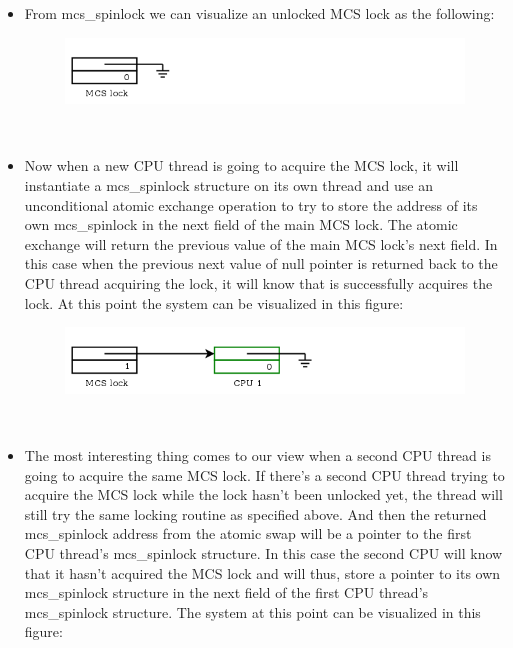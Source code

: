 \documentclass[10pt]{sigplanconf}
\begin{document}
\begin{itemize}
	\item From mcs\_spinlock we can visualize an unlocked MCS lock as the following:\\
	\begin{figure}[h]
		\includegraphics[scale=0.4]{mcslock1.png}
	\end{figure}\\
	\item Now when a new CPU thread is going to acquire the MCS lock, it will instantiate a mcs\_spinlock structure on its own thread and use an unconditional atomic exchange operation to try to store the address of its own mcs\_spinlock in the next field of the main MCS lock. The atomic exchange will return the previous value of the main MCS lock's next field. In this case when the previous next value of null pointer is returned back to the CPU thread acquiring the lock, it will know that is successfully acquires the lock. At this point the system can be visualized in this figure:\\
	\begin{figure}[h!]
		\includegraphics[scale=0.4]{mcslock2.png}
	\end{figure}\\
	\item The most interesting thing comes to our view when a second CPU thread is going to acquire the same MCS lock. If there's a second CPU thread trying to acquire the MCS lock while the lock hasn't been unlocked yet, the thread will still try the same locking routine as specified above. And then the returned mcs\_spinlock address from the atomic swap will be a pointer to the first CPU thread's mcs\_spinlock structure. In this case the second CPU will know that it hasn't acquired the MCS lock and will thus, store a pointer to its own mcs\_spinlock structure in the next field of the first CPU thread's mcs\_spinlock structure. The system at this point can be visualized in this figure:
	\begin{figure}[h!]

\end{figure}
\end{itemize}
\end{document}
